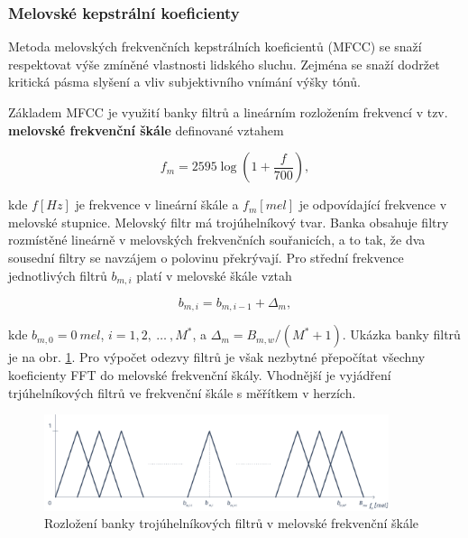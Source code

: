 \subsubsection{Melovské kepstrální koeficienty}

Metoda melovských frekvenčních kepstrálních koeficientů (MFCC) se snaží respektovat výše zmíněné vlastnosti lidského sluchu. Zejména se snaží dodržet kritická pásma slyšení a vliv subjektivního vnímání výšky tónů.

Základem MFCC je využití banky filtrů a lineárním rozložením frekvencí v tzv. \textbf{melovské frekvenční škále} definované vztahem

\begin{equation}
  f_m = 2595 \log \left(1 + \frac{f}{700}\right),
  \label{eq:asr:mfcc:melscale}
\end{equation}

\noindent kde $f \left[Hz\right]$ je frekvence v lineární škále a $f_m \left[mel\right]$ je odpovídající frekvence v melovské stupnice. Melovský filtr má trojúhelníkový tvar. Banka obsahuje filtry rozmístěné lineárně v melovských frekvenčních souřanicích, a to tak, že dva sousední filtry se navzájem o polovinu překrývají. Pro střední frekvence jednotlivých filtrů $b_{m,i}$ platí v melovské škále vztah

\begin{equation}
  b_{m,i} = b_{m,i-1} + \Delta_{m},
  \label{eq:asr:mfcc:freq}
\end{equation}

\noindent kde $b_{m, 0} = 0\ mel$, $i = 1, 2,\ \dots\ , M^{*}$, a $\Delta_m = B_{m,w} / (M^{*} + 1)$. Ukázka banky filtrů je na obr. \ref{fig:asr:mfcc:bank:mel}. Pro výpočet odezvy filtrů je však nezbytné přepočítat všechny koeficienty FFT do melovské frekvenční škály. Vhodnější je vyjádření trjúhelníkových filtrů ve frekvenční škále s měřítkem v herzích.

\begin{figure}[hbpt]
  \centering
  \includegraphics[width=0.9\textwidth]{./ch4-asr/img/filter_bank-mel.pdf}
  \caption{Rozložení banky trojúhelníkových filtrů v melovské frekvenční škále}
  \label{fig:asr:mfcc:bank:mel}
\end{figure}

